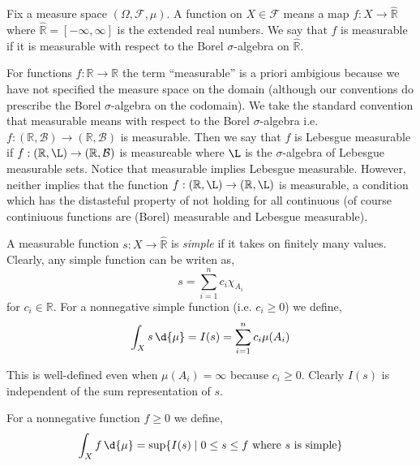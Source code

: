 \documentclass[12pt]{article}
\newcommand{\R}{\mathbb{R}}
\renewcommand{\F}{\mathcal{F}}
\begin{document}
\begin{rmk}
Fix a measure space $(\Omega, \F, \mu)$. A function on $X \in \F$ means a map $f : X \to \hat{\R}$ where $\hat{\R} = [-\infty, \infty]$ is the extended real numbers. We say that $f$ is measurable if it is measurable with respect to the Borel $\sigma$-algebra on $\hat{\R}$.
\end{rmk}

\begin{rmk}
For functions $f : \R \to \R$ the term ``measurable'' is a priori ambigious because we have not specified the measure space on the domain (although our conventions do prescribe the Borel $\sigma$-algebra on the codomain). We take the standard convention that measurable means with respect to the Borel $\sigma$-algebra i.e. $f : (\R, \mathcal{B}) \to (\R, \mathcal{B})$ is measurable. Then we say that $f$ is Lebesgue measurable if $f : (\R, \mathcal{\L}) \to (\R, \mathcal{B})$ is measureable where $\mathcal{\L}$ is the $\sigma$-algebra of Lebesgue measurable sets. Notice that measurable implies Lebesgue measurable. However, neither implies that  the function $f : (\R, \mathcal{\L}) \to (\R, \mathcal{\L})$ is measurable, a condition which has the distasteful property of not holding for all continuous  (of course continiuous functions are (Borel) measurable and Lebesgue measurable). 
\end{rmk}

\begin{defn}
A measurable function $s : X \to \hat{\R}$ is \textit{simple} if it takes on finitely many values. Clearly, any simple function can be writen as,
\[ s = \sum_{i = 1}^n c_i \chi_{A_i} \]
for $c_i \in \R$. For a nonnegative simple function (i.e. $c_i \ge 0$) we define,
\[ \int_X s \, \d{\mu} = I(s) = \sum_{i = 1}^n c_i \mu(A_i) \]
\end{defn}

\begin{rmk}
This is well-defined even when $\mu(A_i) = \infty$ because $c_i \ge 0$. Clearly $I(s)$ is independent of the sum representation of $s$.
\end{rmk}

\begin{defn}
For a nonnegative function $f \ge 0$ we define,
\[ \int_X f \, \d{\mu} = \sup \{ I(s) \mid 0 \le s \le f \text{ where } s \text{ is simple} \} \]
\end{defn}
\end{document}
